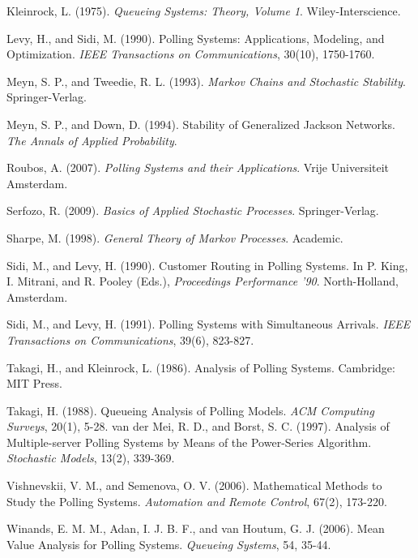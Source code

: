 \documentclass[12pt]{article}
\begin{document}
\begin{thebibliography}{99}
 Kleinrock, L. (1975). \textit{Queueing Systems: Theory, Volume 1}. Wiley-Interscience.

 Levy, H., and Sidi, M. (1990). Polling Systems: Applications, Modeling, and Optimization. \textit{IEEE Transactions on Communications}, 30(10), 1750-1760.


 Meyn, S. P., and Tweedie, R. L. (1993). \textit{Markov Chains and Stochastic Stability}. Springer-Verlag.

 Meyn, S. P., and Down, D. (1994). Stability of Generalized Jackson Networks. \textit{The Annals of Applied Probability}.


 Roubos, A. (2007). \textit{Polling Systems and their Applications}. Vrije Universiteit Amsterdam.

 Serfozo, R. (2009). \textit{Basics of Applied Stochastic Processes}. Springer-Verlag.

 Sharpe, M. (1998). \textit{General Theory of Markov Processes}. Academic.


 Sidi, M., and Levy, H. (1990). Customer Routing in Polling Systems. In P. King, I. Mitrani, and R. Pooley (Eds.), \textit{Proceedings Performance '90}. North-Holland, Amsterdam.

 Sidi, M., and Levy, H. (1991). Polling Systems with Simultaneous Arrivals. \textit{IEEE Transactions on Communications}, 39(6), 823-827.

 Takagi, H., and Kleinrock, L. (1986). Analysis of Polling Systems. Cambridge: MIT Press.

 Takagi, H. (1988). Queueing Analysis of Polling Models. \textit{ACM Computing Surveys}, 20(1), 5-28.
 van der Mei, R. D., and Borst, S. C. (1997). Analysis of Multiple-server Polling Systems by Means of the Power-Series Algorithm. \textit{Stochastic Models}, 13(2), 339-369.


 Vishnevskii, V. M., and Semenova, O. V. (2006). Mathematical Methods to Study the Polling Systems. \textit{Automation and Remote Control}, 67(2), 173-220.

 Winands, E. M. M., Adan, I. J. B. F., and van Houtum, G. J. (2006). Mean Value Analysis for Polling Systems. \textit{Queueing Systems}, 54, 35-44.
\end{thebibliography}
\end{document}
